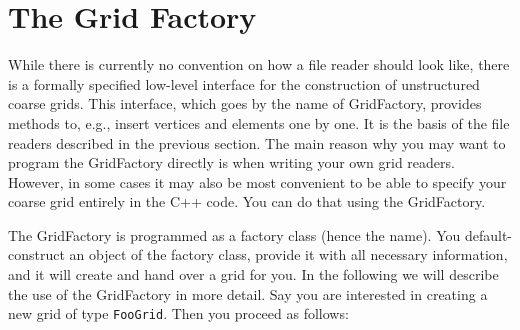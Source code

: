 \documentclass[11pt,a4paper,headinclude,footinclude,DIV16,normalheadings]{scrreprt}
\begin{document}
\section{The Grid Factory}
\label{sec:grid_factory}

While there is currently no convention on how a file reader should look like,
there is a formally specified low-level interface for the construction of
unstructured coarse grids.  This interface, which goes by the name of
GridFactory, provides methods to, e.g., insert vertices and elements one by one.
It is the basis of the file readers described in the previous section.
The main reason why you may want to program the GridFactory directly is
when writing your own grid readers.  However, in some cases it may also be
most convenient to be able to specify your coarse grid entirely in the
C++ code.  You can do that using the GridFactory.

The GridFactory is programmed as a factory class (hence the name).
You default-construct an object of the factory class, provide it with all
necessary information, and it will create and hand over a grid for you.
In the following we will describe the use of the GridFactory in more detail.
Say you are interested in creating a new grid of type \lstinline!FooGrid!.  Then
you proceed as follows:
\end{document}
